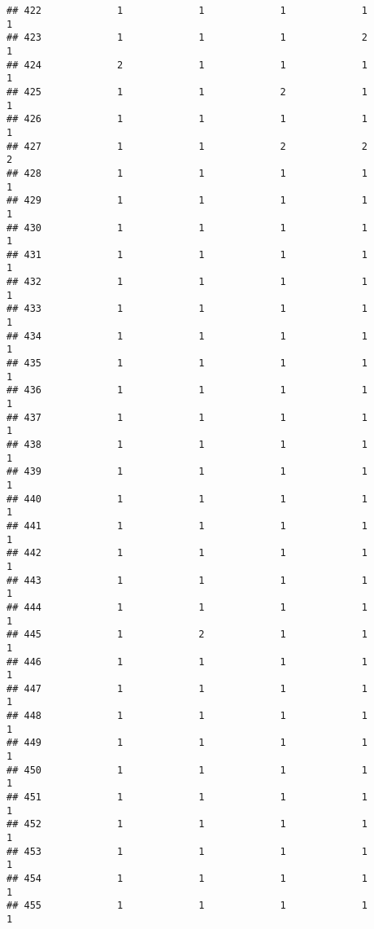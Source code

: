 \documentclass[
]{article}
\begin{document}
\begin{verbatim}
## 422             1             1             1             1             1
## 423             1             1             1             2             1
## 424             2             1             1             1             1
## 425             1             1             2             1             1
## 426             1             1             1             1             1
## 427             1             1             2             2             2
## 428             1             1             1             1             1
## 429             1             1             1             1             1
## 430             1             1             1             1             1
## 431             1             1             1             1             1
## 432             1             1             1             1             1
## 433             1             1             1             1             1
## 434             1             1             1             1             1
## 435             1             1             1             1             1
## 436             1             1             1             1             1
## 437             1             1             1             1             1
## 438             1             1             1             1             1
## 439             1             1             1             1             1
## 440             1             1             1             1             1
## 441             1             1             1             1             1
## 442             1             1             1             1             1
## 443             1             1             1             1             1
## 444             1             1             1             1             1
## 445             1             2             1             1             1
## 446             1             1             1             1             1
## 447             1             1             1             1             1
## 448             1             1             1             1             1
## 449             1             1             1             1             1
## 450             1             1             1             1             1
## 451             1             1             1             1             1
## 452             1             1             1             1             1
## 453             1             1             1             1             1
## 454             1             1             1             1             1
## 455             1             1             1             1             1

\end{verbatim}
\end{document}
